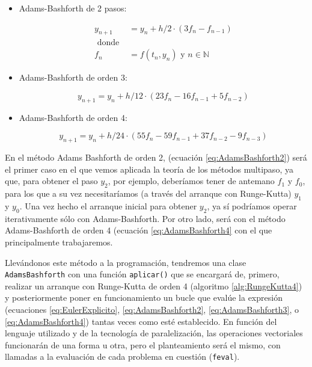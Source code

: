 \begin{itemize}
	\item  Adams-Bashforth de 2 pasos:
	
	\begin{equation}
		\label{eq:AdamsBashforth2}
		\begin{split}
			y_{n+1} &= y_n + h/2 \cdot (3f_n-f_{n-1}) \\
			\text{ donde }\\
			f_n&=f(t_n,y_n) \text{ y } n \in \mathbb{N}
		\end{split}
	\end{equation}
	
	\item  Adams-Bashforth de orden 3:
	
	\begin{equation}
		\label{eq:AdamsBashforth3}
		y_{n+1} = y_n + h/12 \cdot (23f_n - 16f_{n-1} + 5f_{n-2})
	\end{equation}
	
	\item Adams-Bashforth de orden 4:
	
	\begin{equation}
		\label{eq:AdamsBashforth4}
		y_{n+1} = y_n + h/24 \cdot (55f_n - 59f_{n-1} + 37f_{n-2} - 9f_{n-3})
	\end{equation}
\end{itemize}

En el método Adams Bashforth de orden 2, (ecuación \ref{eq:AdamsBashforth2}) será el primer caso en el que vemos aplicada la teoría de los métodos multipaso, ya que, para obtener el paso $y_2$, por ejemplo, deberíamos tener de antemano $f_1$ y $f_0$, para los que a su vez necesitaríamos (a través del arranque con Runge-Kutta) $y_1$ y $y_0$. Una vez hecho el arranque inicial para obtener $y_2$, ya sí podríamos operar iterativamente sólo con Adams-Bashforth. Por otro lado, será con el método Adams-Bashforth de orden 4 (ecuación \ref{eq:AdamsBashforth4} con el que principalmente trabajaremos.

Llevándonos este método a la programación, tendremos una clase \texttt{Adams\-Bashforth} con una función \texttt{aplicar()} que se encargará de, primero, realizar un arranque con Runge-Kutta de orden 4 (algoritmo \ref{alg:RungeKutta4}) y posteriormente poner en funcionamiento un bucle que evalúe la expresión (ecuaciones \ref{eq:EulerExplicito}, \ref{eq:AdamsBashforth2}, \ref{eq:AdamsBashforth3}, o \ref{eq:AdamsBashforth4}) tantas veces como esté establecido. En función del lenguaje utilizado y de la tecnología de paralelización, las operaciones vectoriales funcionarán de una forma u otra, pero el planteamiento será el mismo, con llamadas a la evaluación de cada problema en cuestión (\texttt{feval}).

